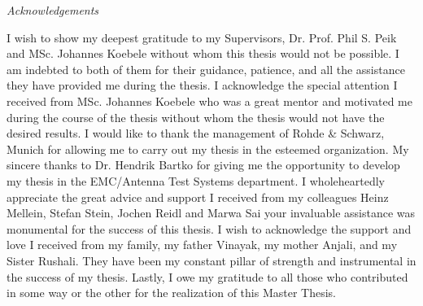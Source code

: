 


\newpage
\thispagestyle{empty}

\begin{center}
\Huge\emph{Acknowledgements}
\end{center}
\medskip

\noindent I wish to show my deepest gratitude to my Supervisors, Dr. Prof. Phil S. Peik and MSc. Johannes Koebele without whom this thesis would not be possible. I am indebted to both of them for their guidance, patience, and all the assistance they have provided me during the thesis. I acknowledge the special attention I received from MSc. Johannes Koebele who was a great mentor and motivated me during the course of the thesis without whom the thesis would not have the desired results. I would like to thank the management of Rohde \& Schwarz, Munich for allowing me to carry out my thesis in the esteemed organization. My sincere thanks to Dr. Hendrik Bartko for giving me the opportunity to develop my thesis in the EMC/Antenna Test Systems department. I wholeheartedly appreciate the great advice and support I received from my colleagues Heinz Mellein, Stefan Stein, Jochen Reidl and Marwa Sai your invaluable assistance was monumental for the success of this thesis. I wish to acknowledge the support and love I received from my family, my father Vinayak, my mother Anjali, and my Sister Rushali. They have been my constant pillar of strength and instrumental in the success of my thesis. Lastly, I owe my gratitude to all those who contributed in some way or the other for the realization of this Master Thesis.


